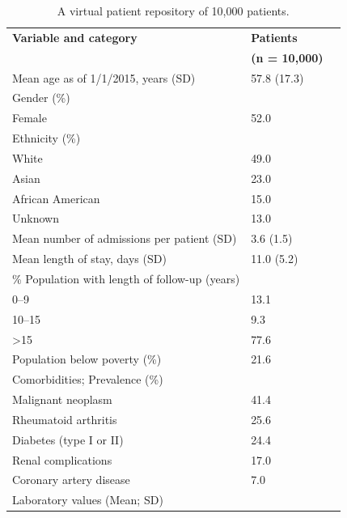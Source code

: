 \documentclass[review,12pt]{elsarticle}
\begin{document}
\begin{table}[h!]
\centering
\caption{A virtual patient repository of 10,000 patients.}
\begin{tabular}{@{}lp{8cm}r@{}}
\toprule
\textbf{Variable and category} & \textbf{Patients} \\
\textbf{} & \textbf{(n = 10,000)} \\ 
\midrule
Mean age as of 1/1/2015, years (SD) & 57.8 (17.3) \\ 
Gender (\%) & \\
\hspace{1em} Female & 52.0 \\ 
Ethnicity (\%) & \\
\hspace{1em} White & 49.0 \\ 
\hspace{1em} Asian & 23.0 \\ 
\hspace{1em} African American & 15.0 \\ 
\hspace{1em} Unknown & 13.0 \\ 
Mean number of admissions per patient (SD) & 3.6 (1.5) \\ 
Mean length of stay, days (SD) & 11.0 (5.2) \\ 
\% Population with length of follow-up (years) & \\ 
\hspace{1em} 0–9 & 13.1 \\ 
\hspace{1em} 10–15 & 9.3 \\ 
\hspace{1em} \textgreater 15 & 77.6 \\ 
Population below poverty (\%) & 21.6 \\ 
Comorbidities; Prevalence (\%) & \\ 
\hspace{1em} Malignant neoplasm & 41.4 \\ 
\hspace{1em} Rheumatoid arthritis & 25.6 \\ 
\hspace{1em} Diabetes (type I or II) & 24.4 \\ 
\hspace{1em} Renal complications & 17.0 \\ 
\hspace{1em} Coronary artery disease & 7.0 \\ 
Laboratory values (Mean; SD) & \\ 

\end{tabular}
\end{table}
\end{document}
